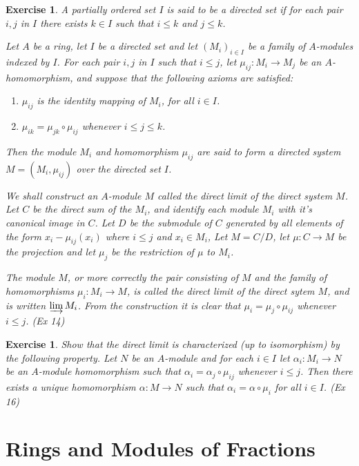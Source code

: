 \documentclass[]{report}
\newtheorem{exercise}[theorem]{Exercise}
\begin{document}
\begin{exercise}
    A partially ordered set $I$ is said to be a directed set if for each pair $i, j$ in $I$ there exists $k\in I$ such that $i\leq k$ and $j\leq k$. 

    Let $A$ be a ring, let $I$ be a directed set and let $(M_i)_{i\in I}$ be a family of $A$-modules indexed by $I$. For each pair $i,j$ in $I$ such that $i\leq j$, let $\mu_{ij}: M_i \rightarrow M_j$ be an $A$-homomorphism, and suppose that the following axioms are satisfied:
    \begin{enumerate}
        \item $\mu_{ij}$ is the identity mapping of $M_i$, for all $i\in I$.
        \item $\mu_{ik} = \mu_{jk} \circ \mu_{ij}$ whenever $i\leq j\leq k$.
    \end{enumerate}

    Then the module $M_i$ and homomorphism $\mu_{ij}$ are said to form a directed system  $M = (M_i, \mu_{ij})$ over the directed set $I$. 

    We shall construct an $A$-module $M$ called the direct limit of the direct system $M$. Let $C$ be the direct sum of the $M_i$, and identify each module $M_i$ with it's canonical image in $C$. Let $D$ be the submodule of $C$ generated by all elements of the form $x_i-\mu_{ij}(x_i)$ where $i\leq j$ and $x_i\in M_i$, Let $M= C/D$, let $\mu: C \rightarrow M$ be the projection and let $\mu_j$ be the restriction of $\mu$ to $M_i$. 

    The module $M$, or more correctly the pair consisting of $M$ and the family of homomorphisms $\mu_i: M_i \rightarrow M$, is called the direct limit of the direct sytem $M$, and is written $\varinjlim M_i$. From the construction it is clear that $\mu_i = \mu_j \circ \mu_{ij}$ whenever $i\leq j$.
    (Ex 14)
\end{exercise}

\begin{exercise}
    Show that the direct limit is characterized (up to isomorphism) by the following property. Let $N$ be an $A$-module and for each $i\in I$ let $\alpha_i: M_i\rightarrow N$ be an $A$-module homomorphism such that $\alpha_i = \alpha_j \circ \mu_{ij}$ whenever $i\leq j$. Then there exists a unique homomorphism $\alpha: M\rightarrow N$ such that $\alpha_i = \alpha \circ \mu_i$ for all $i\in I$.
    (Ex 16)
\end{exercise}

\chapter{Rings and Modules of Fractions}
\end{document}
